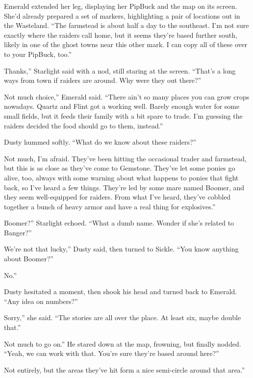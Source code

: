 Emerald extended her leg, displaying her PipBuck and the map on its screen. She’d already prepared a set of markers, highlighting a pair of locations out in the Wasteland. “The farmstead is about half a day to the southeast. I’m not sure exactly where the raiders call home, but it seems they’re based further south, likely in one of the ghost towns near this other mark. I can copy all of these over to your PipBuck, too.”

\leavevmode{}Thanks,” Starlight said with a nod, still staring at the screen. “That’s a long ways from town if raiders are around. Why were they out there?”

\leavevmode{}Not much choice,” Emerald said. “There ain’t so many places you can grow crops nowadays. Quartz and Flint got a working well. Barely enough water for some small fields, but it feeds their family with a bit spare to trade. I’m guessing the raiders decided the food should go to them, instead.”

Dusty hummed softly. “What do we know about these raiders?”

\leavevmode{}Not much, I’m afraid. They’ve been hitting the occasional trader and farmstead, but this is as close as they’ve come to Gemstone. They’ve let some ponies go alive, too, always with some warning about what happens to ponies that fight back, so I’ve heard a few things. They’re led by some mare named Boomer, and they seem well-equipped for raiders. From what I’ve heard, they’ve cobbled together a bunch of heavy armor and have a real thing for explosives.”

\leavevmode{}Boomer?” Starlight echoed. “What a dumb name. Wonder if she’s related to Banger?”

\leavevmode{}We’re not that lucky,” Dusty said, then turned to Sickle. “You know anything about Boomer?”

\leavevmode{}No.”

Dusty hesitated a moment, then shook his head and turned back to Emerald. “Any idea on numbers?”

\leavevmode{}Sorry,” she said. “The stories are all over the place. At least six, maybe double that.”

\leavevmode{}Not much to go on.” He stared down at the map, frowning, but finally nodded. “Yeah, we can work with that. You’re sure they’re based around here?”

\leavevmode{}Not entirely, but the areas they’ve hit form a nice semi-circle around that area.”

